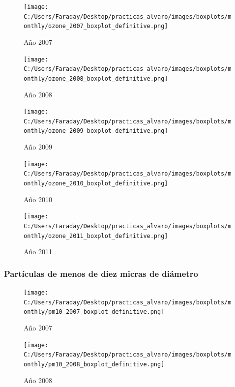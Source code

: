 \documentclass[12pt]{article}
\begin{document}
\begin{figure}[H]
\texttt{[image: C:/Users/Faraday/Desktop/practicas\_alvaro/images/boxplots/monthly/ozone\_2007\_boxplot\_definitive.png]}
\caption{Año 2007}
\label{fig:box-ann-2-2007}
\end{figure}

\begin{figure}[H]
\texttt{[image: C:/Users/Faraday/Desktop/practicas\_alvaro/images/boxplots/monthly/ozone\_2008\_boxplot\_definitive.png]}
\caption{Año 2008}
\label{fig:box-ann-2-2008}
\end{figure}

\newpage

\begin{figure}[H]
\texttt{[image: C:/Users/Faraday/Desktop/practicas\_alvaro/images/boxplots/monthly/ozone\_2009\_boxplot\_definitive.png]}
\caption{Año 2009}
\label{fig:box-ann-2-2009}
\end{figure}

\begin{figure}[H]
\texttt{[image: C:/Users/Faraday/Desktop/practicas\_alvaro/images/boxplots/monthly/ozone\_2010\_boxplot\_definitive.png]}
\caption{Año 2010}
\label{fig:box-ann-2-2010}
\end{figure}

\newpage

\begin{figure}[H]
\texttt{[image: C:/Users/Faraday/Desktop/practicas\_alvaro/images/boxplots/monthly/ozone\_2011\_boxplot\_definitive.png]}
\caption{Año 2011}
\label{fig:box-ann-2-2011}
\end{figure}

\newpage

\subsubsection*{Partículas de menos de diez micras de diámetro}
%

\begin{figure}[H]
\texttt{[image: C:/Users/Faraday/Desktop/practicas\_alvaro/images/boxplots/monthly/pm10\_2007\_boxplot\_definitive.png]}
\caption{Año 2007}
\label{fig:box-ann-3-2007}
\end{figure}

\begin{figure}[H]
\texttt{[image: C:/Users/Faraday/Desktop/practicas\_alvaro/images/boxplots/monthly/pm10\_2008\_boxplot\_definitive.png]}
\caption{Año 2008}
\label{fig:box-ann-3-2008}
\end{figure}
\end{document}

